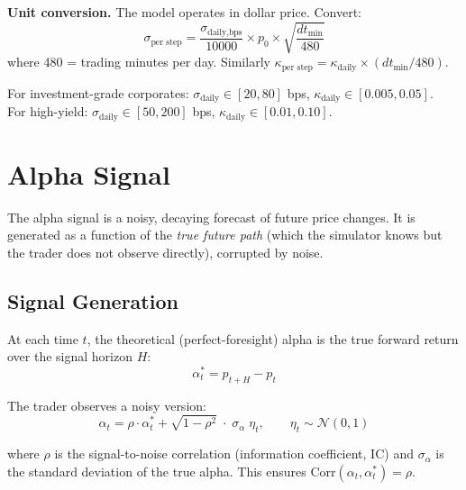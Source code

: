 \documentclass[11pt,a4paper]{article}
\begin{document}
\textbf{Unit conversion.} The model operates in dollar price. Convert:
\begin{equation}
\sigma_{\text{per step}} = \frac{\sigma_{\text{daily,bps}}}{10000} \times p_0 \times \sqrt{\frac{dt_{\text{min}}}{480}}
\end{equation}
where 480 = trading minutes per day. Similarly $\kappa_{\text{per step}} = \kappa_{\text{daily}} \times (dt_{\text{min}} / 480)$.

\begin{specbox}
For investment-grade corporates: $\sigma_{\text{daily}} \in [20, 80]$ bps, $\kappa_{\text{daily}} \in [0.005, 0.05]$.\\
For high-yield: $\sigma_{\text{daily}} \in [50, 200]$ bps, $\kappa_{\text{daily}} \in [0.01, 0.10]$.
\end{specbox}


\section{Alpha Signal}\label{sec:alpha}

The alpha signal is a noisy, decaying forecast of future price changes. It is generated as a function of the \emph{true future path} (which the simulator knows but the trader does not observe directly), corrupted by noise.

\subsection{Signal Generation}

At each time $t$, the theoretical (perfect-foresight) alpha is the true forward return over the signal horizon $H$:
\begin{equation}
\alpha^*_t = p_{t+H} - p_t
\end{equation}

The trader observes a noisy version:
\begin{equation}
\alpha_t = \rho \cdot \alpha^*_t + \sqrt{1 - \rho^2}\;\cdot\;\sigma_{\alpha}\;\eta_t, \qquad \eta_t \sim \mathcal{N}(0,1)
\end{equation}

where $\rho$ is the signal-to-noise correlation (information coefficient, IC) and $\sigma_\alpha$ is the standard deviation of the true alpha. This ensures $\text{Corr}(\alpha_t, \alpha^*_t) = \rho$.
\end{document}
